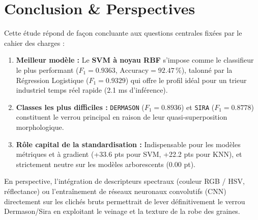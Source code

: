 \documentclass[10pt,a4paper,twocolumn]{article}
\begin{document}
\vfill
\columnbreak

\section{Conclusion \& Perspectives}
\label{sec:conclusion}

Cette étude répond de façon concluante aux questions centrales fixées par le cahier des charges :
\begin{enumerate}
    \item \textbf{Meilleur modèle :} Le \textbf{SVM à noyau RBF} s'impose comme le classifieur le plus performant ($F_1 = \mathbf{0.9363}$, $\text{Accuracy} = \mathbf{92.47\,\%}$), talonné par la Régression Logistique ($F_1 = 0.9329$) qui offre le profil idéal pour un trieur industriel temps réel rapide (2.1 ms d'inférence).
    \item \textbf{Classes les plus difficiles :} \texttt{DERMASON} ($F_1 = 0.8936$) et \texttt{SIRA} ($F_1 = 0.8778$) constituent le verrou principal en raison de leur quasi-superposition morphologique.
    \item \textbf{Rôle capital de la standardisation :} Indispensable pour les modèles métriques et à gradient (+33.6 pts pour SVM, +22.2 pts pour KNN), et strictement neutre sur les modèles arborescents (0.00 pt).
\end{enumerate}

En perspective, l'intégration de descripteurs spectraux (couleur RGB / HSV, réflectance) ou l'entraînement de réseaux neuronaux convolutifs (CNN) directement sur les clichés bruts permettrait de lever définitivement le verrou Dermason/Sira en exploitant le veinage et la texture de la robe des graines.

\FloatBarrier
\begingroup
\footnotesize


\endgroup
\end{document}
